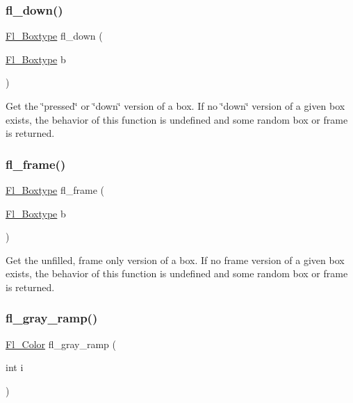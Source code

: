 \subsubsection{\texorpdfstring{fl\+\_\+down()}{fl\_down()}}
{\footnotesize\ttfamily \hyperlink{_enumerations_8_h_ae48bf9070f8541de17829f54ccacc6bc}{Fl\+\_\+\+Boxtype} fl\+\_\+down (\begin{DoxyParamCaption}\item[{\hyperlink{_enumerations_8_h_ae48bf9070f8541de17829f54ccacc6bc}{Fl\+\_\+\+Boxtype}}]{b }\end{DoxyParamCaption})\hspace{0.3cm}{\ttfamily [inline]}}

Get the \char`\"{}pressed\char`\"{} or \char`\"{}down\char`\"{} version of a box. If no \char`\"{}down\char`\"{} version of a given box exists, the behavior of this function is undefined and some random box or frame is returned. \mbox{\label{_enumerations_8_h_a06e61a87a8570f7debc751a1e2f5340f}} 
\subsubsection{\texorpdfstring{fl\+\_\+frame()}{fl\_frame()}}
{\footnotesize\ttfamily \hyperlink{_enumerations_8_h_ae48bf9070f8541de17829f54ccacc6bc}{Fl\+\_\+\+Boxtype} fl\+\_\+frame (\begin{DoxyParamCaption}\item[{\hyperlink{_enumerations_8_h_ae48bf9070f8541de17829f54ccacc6bc}{Fl\+\_\+\+Boxtype}}]{b }\end{DoxyParamCaption})\hspace{0.3cm}{\ttfamily [inline]}}

Get the unfilled, frame only version of a box. If no frame version of a given box exists, the behavior of this function is undefined and some random box or frame is returned. \mbox{\label{_enumerations_8_h_a6045423248a367d4d3885109f18e0bd9}} 
\subsubsection{\texorpdfstring{fl\+\_\+gray\+\_\+ramp()}{fl\_gray\_ramp()}}
{\footnotesize\ttfamily \hyperlink{_enumerations_8_h_a8b762953646f8abee866061f1af78a6a}{Fl\+\_\+\+Color} fl\+\_\+gray\+\_\+ramp (\begin{DoxyParamCaption}\item[{int}]{i }\end{DoxyParamCaption})\hspace{0.3cm}{\ttfamily [inline]}}

